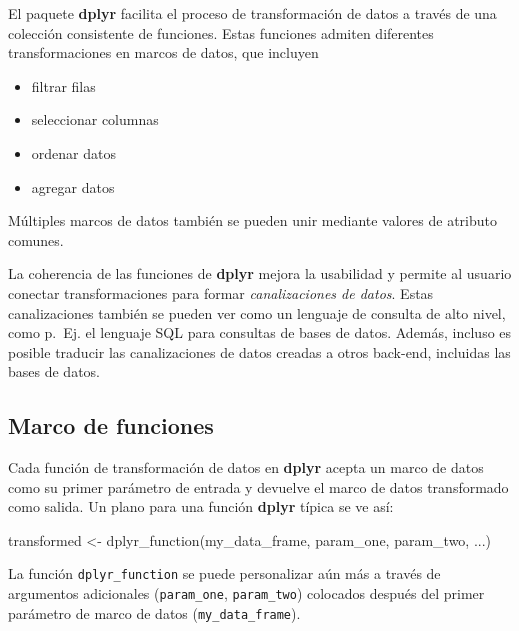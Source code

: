 \documentclass[
]{book}
\newenvironment{Shaded}{\begin{snugshade}}{\end{snugshade}}
\newcommand{\FunctionTok}[1]{\textcolor[rgb]{0.00,0.00,0.00}{#1}}
\newcommand{\NormalTok}[1]{#1}
\newcommand{\OtherTok}[1]{\textcolor[rgb]{0.56,0.35,0.01}{#1}}
\providecommand{\tightlist}{%
  \setlength{\itemsep}{0pt}\setlength{\parskip}{0pt}}
\begin{document}
El paquete \textbf{dplyr} facilita el proceso de transformación de datos a través de una colección consistente de funciones. Estas funciones admiten diferentes transformaciones en marcos de datos, que incluyen

\begin{itemize}
\tightlist
\item
  filtrar filas
\item
  seleccionar columnas
\item
  ordenar datos
\item
  agregar datos
\end{itemize}

Múltiples marcos de datos también se pueden unir mediante valores de atributo comunes.

La coherencia de las funciones de \textbf{dplyr} mejora la usabilidad y permite al usuario conectar transformaciones para formar \emph{canalizaciones de datos}. Estas canalizaciones también se pueden ver como un lenguaje de consulta de alto nivel, como p.~Ej. el lenguaje SQL para consultas de bases de datos. Además, incluso es posible traducir las canalizaciones de datos creadas a otros back-end, incluidas las bases de datos.

\hypertarget{marco-de-funciones}{%
\subsection{Marco de funciones}\label{marco-de-funciones}}

Cada función de transformación de datos en \textbf{dplyr} acepta un marco de datos como su primer parámetro de entrada y devuelve el marco de datos transformado como salida. Un plano para una función \textbf{dplyr} típica se ve así:

\begin{Shaded}
\begin{Highlighting}[]
\NormalTok{transformed }\OtherTok{\textless{}{-}} \FunctionTok{dplyr\_function}\NormalTok{(my\_data\_frame, }
\NormalTok{                              param\_one, }
\NormalTok{                              param\_two, }
\NormalTok{                              ...)}
\end{Highlighting}
\end{Shaded}

La función \texttt{dplyr\_function} se puede personalizar aún más a través de argumentos adicionales (\texttt{param\_one}, \texttt{param\_two}) colocados después del primer parámetro de marco de datos (\texttt{my\_data\_frame}).
\end{document}
